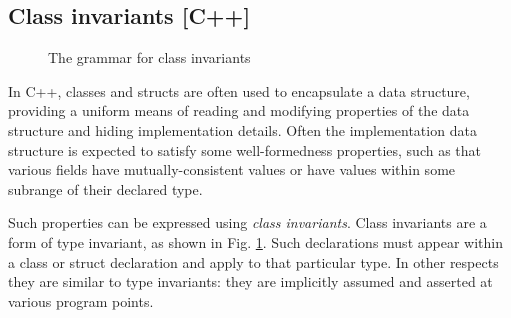 \subsection{Class invariants [C++]}

\begin{figure}[t]
\begin{cadre}

\end{cadre}
\caption{The grammar for class invariants}
\label{fig:gram:classinvariant}
\end{figure}

In C++, classes and structs are often used to encapsulate a data structure, 
providing a uniform means of reading and modifying properties of the data
structure and hiding implementation details. Often the implementation
data structure is expected to satisfy some well-formedness properties, such as
that various fields have mutually-consistent values or have values within
some subrange of their declared type.

Such properties can be expressed using \textit{class invariants}. Class invariants
are a form of type invariant, as shown in Fig. \ref{fig:gram:classinvariant}.
Such declarations must appear within a class or struct declaration and 
apply to that particular type. In other respects they are similar to 
type invariants: they are implicitly assumed and asserted at various
program points.
